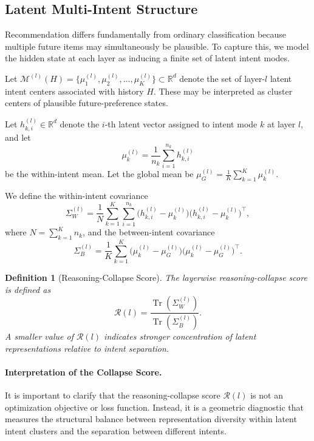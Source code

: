 \documentclass[lettersize,journal]{IEEEtran}
\newtheorem{definition}{Definition}
\newcommand{\R}{\mathbb{R}}
\newcommand{\tr}{\operatorname{Tr}}
\begin{document}
\subsection{Latent Multi-Intent Structure}
Recommendation differs fundamentally from ordinary classification because multiple future items may simultaneously be plausible. To capture this, we model the hidden state at each layer as inducing a finite set of latent intent modes.

Let $\mathcal{M}^{(l)}(H) = \{\mu_1^{(l)}, \mu_2^{(l)}, \dots, \mu_K^{(l)}\} \subset \R^d$ denote the set of layer-$l$ latent intent centers associated with history $H$. These may be interpreted as cluster centers of plausible future-preference states.

Let $h_{k,i}^{(l)} \in \R^d$ denote the $i$-th latent vector assigned to intent mode $k$ at layer $l$, and let
\begin{equation}
\mu_k^{(l)} = \frac{1}{n_k}\sum_{i=1}^{n_k} h_{k,i}^{(l)}
\end{equation}
be the within-intent mean. Let the global mean be $\mu_G^{(l)} = \frac{1}{K}\sum_{k=1}^K \mu_k^{(l)}$.

We define the within-intent covariance
\begin{equation}
\Sigma_W^{(l)} =
\frac{1}{N}
\sum_{k=1}^K \sum_{i=1}^{n_k}
\bigl(h_{k,i}^{(l)} - \mu_k^{(l)}\bigr)\bigl(h_{k,i}^{(l)} - \mu_k^{(l)}\bigr)^\top,
\end{equation}
where $N=\sum_{k=1}^K n_k$, and the between-intent covariance
\begin{equation}
\Sigma_B^{(l)} =
\frac{1}{K}
\sum_{k=1}^K
\bigl(\mu_k^{(l)} - \mu_G^{(l)}\bigr)\bigl(\mu_k^{(l)} - \mu_G^{(l)}\bigr)^\top.
\end{equation}

\begin{definition}[Reasoning-Collapse Score]
The layerwise reasoning-collapse score is defined as
\begin{equation}
\mathcal{R}(l) =
\frac{\tr(\Sigma_W^{(l)})}{\tr(\Sigma_B^{(l)})}.
\end{equation}
A smaller value of $\mathcal{R}(l)$ indicates stronger concentration of latent representations relative to intent separation.
\end{definition}

\paragraph{Interpretation of the Collapse Score.}
It is important to clarify that the reasoning-collapse score $\mathcal{R}(l)$ is not an optimization objective or loss function. Instead, it is a geometric diagnostic that measures the structural balance between representation diversity within latent intent clusters and the separation between different intents.
\end{document}
